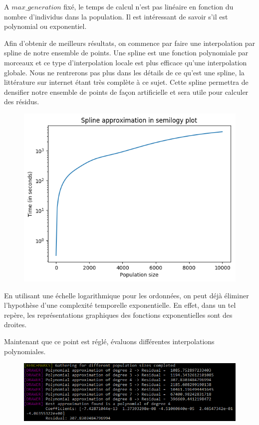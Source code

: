 A $max\_generation$ fixé, le temps de calcul n'est pas linéaire en fonction du nombre d'individus dans la population. Il est intéressant de savoir s'il est polynomial ou exponentiel.

Afin d'obtenir de meilleurs résultats, on commence par faire une interpolation par spline de notre ensemble de points. Une spline est une fonction polynomiale par morceaux et ce type d'interpolation locale est plus efficace qu'une interpolation globale. Nous ne rentrerons pas plus dans les détails de ce qu'est une spline, la littérature sur internet étant très complète à ce sujet. Cette spline permettra de densifier notre ensemble de points de façon artificielle et sera utile pour calculer des résidus.

\begin{figure}[!h]
    \centering
    \includegraphics[]{report/Pictures/setb4c9_expo_semilogy.png}
\end{figure}

En utilisant une échelle logarithmique pour les ordonnées, on peut déjà éliminer l'hypothèse d'une complexité temporelle exponentielle. En effet, dans un tel repère, les représentations graphiques des fonctions exponentielles sont des droites.

Maintenant que ce point est réglé, évaluons différentes interpolations polynomiales.

\begin{figure}[!h]
    \centering
    \includegraphics[width=\linewidth]{report/Pictures/setb4c9_approximation_result.png}
\end{figure}

